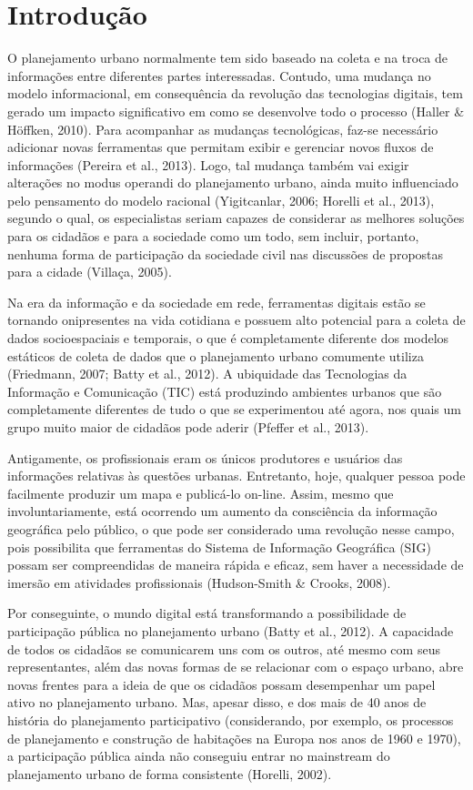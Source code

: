 \documentclass{article}
\begin{document}
\section{Introdução}

O planejamento urbano normalmente tem sido baseado na coleta e na troca de
informações entre diferentes partes interessadas. Contudo, uma mudança no modelo
informacional, em consequência da revolução das tecnologias digitais, tem gerado
um
impacto significativo em como se desenvolve todo o processo (Haller \& Höffken,
2010). Para acompanhar as mudanças
tecnológicas, faz-se necessário adicionar novas ferramentas que permitam exibir
e
gerenciar novos fluxos de informações (Pereira et
al., 2013). Logo, tal mudança também vai exigir alterações no
modus operandi do planejamento urbano, ainda muito influenciado
pelo pensamento do modelo racional (Yigitcanlar,
2006; Horelli et al., 2013),
segundo o qual, os especialistas seriam capazes de considerar as melhores
soluções
para os cidadãos e para a sociedade como um todo, sem incluir, portanto, nenhuma
forma de participação da sociedade civil nas discussões de propostas para a
cidade
(Villaça, 2005).

Na era da informação e da sociedade em rede, ferramentas digitais estão se
tornando
onipresentes na vida cotidiana e possuem alto potencial para a coleta de dados
socioespaciais e temporais, o que é completamente diferente dos modelos
estáticos de
coleta de dados que o planejamento urbano comumente utiliza (Friedmann, 2007;
Batty et
al., 2012). A ubiquidade das Tecnologias da Informação e Comunicação
(TIC) está produzindo ambientes urbanos que são completamente diferentes de tudo
o
que se experimentou até agora, nos quais um grupo muito maior de cidadãos pode
aderir (Pfeffer et al., 2013).

Antigamente, os profissionais eram os únicos produtores e usuários das
informações
relativas às questões urbanas. Entretanto, hoje, qualquer pessoa pode facilmente
produzir um mapa e publicá-lo on-line. Assim, mesmo que involuntariamente, está
ocorrendo um aumento da consciência da informação geográfica pelo público, o que
pode ser considerado uma revolução nesse campo, pois possibilita que ferramentas
do
Sistema de Informação Geográfica (SIG) possam ser compreendidas de maneira
rápida e
eficaz, sem haver a necessidade de imersão em atividades profissionais
(Hudson-Smith \& Crooks, 2008).

Por conseguinte, o mundo digital está transformando a possibilidade de
participação
pública no planejamento urbano (Batty et al.,
2012). A capacidade de todos os cidadãos se comunicarem uns com os
outros, até mesmo com seus representantes, além das novas formas de se
relacionar
com o espaço urbano, abre novas frentes para a ideia de que os cidadãos possam
desempenhar um papel ativo no planejamento urbano. Mas, apesar disso, e dos mais
de
40 anos de história do planejamento participativo (considerando, por exemplo, os
processos de planejamento e construção de habitações na Europa nos anos de 1960
e
1970), a participação pública ainda não conseguiu entrar no
mainstream do planejamento urbano de forma consistente (Horelli, 2002).
\end{document}
